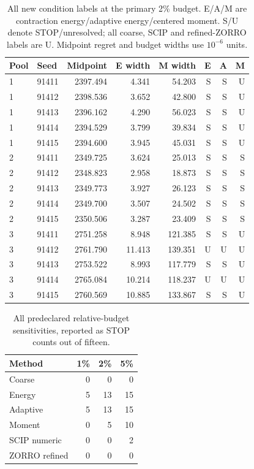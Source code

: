 \begin{table}[t]\centering\small
\caption{All new condition labels at the primary 2\% budget. E/A/M are contraction energy/adaptive energy/centered moment. S/U denote STOP/unresolved; all coarse, SCIP and refined-ZORRO labels are U. Midpoint regret and budget widths use $10^{-6}$ units.}
\begin{tabular}{llrrrrrr}\toprule Pool&Seed&Midpoint&E width&M width&E&A&M\\\midrule
1 & 91411 & 2397.494 & 4.341 & 54.203 & S & S & U\\
1 & 91412 & 2398.536 & 3.652 & 42.800 & S & S & U\\
1 & 91413 & 2396.162 & 4.290 & 56.023 & S & S & U\\
1 & 91414 & 2394.529 & 3.799 & 39.834 & S & S & U\\
1 & 91415 & 2394.600 & 3.945 & 45.031 & S & S & U\\
2 & 91411 & 2349.725 & 3.624 & 25.013 & S & S & S\\
2 & 91412 & 2348.823 & 2.958 & 18.873 & S & S & S\\
2 & 91413 & 2349.773 & 3.927 & 26.123 & S & S & S\\
2 & 91414 & 2349.700 & 3.507 & 24.502 & S & S & S\\
2 & 91415 & 2350.506 & 3.287 & 23.409 & S & S & S\\
3 & 91411 & 2751.258 & 8.948 & 121.385 & S & S & U\\
3 & 91412 & 2761.790 & 11.413 & 139.351 & U & U & U\\
3 & 91413 & 2753.522 & 8.993 & 117.779 & S & S & U\\
3 & 91414 & 2765.084 & 10.214 & 118.237 & U & U & U\\
3 & 91415 & 2760.569 & 10.885 & 133.867 & S & S & U\\
\bottomrule\end{tabular}\end{table}
\begin{table}[tp]\centering\small
\caption{All predeclared relative-budget sensitivities, reported as STOP counts out of fifteen.}
\begin{tabular}{lrrr}\toprule Method&1\%&2\%&5\%\\\midrule
Coarse & 0 & 0 & 0\\
Energy & 5 & 13 & 15\\
Adaptive & 5 & 13 & 15\\
Moment & 0 & 5 & 10\\
SCIP numeric & 0 & 0 & 2\\
ZORRO refined & 0 & 0 & 0\\
\bottomrule\end{tabular}\end{table}

